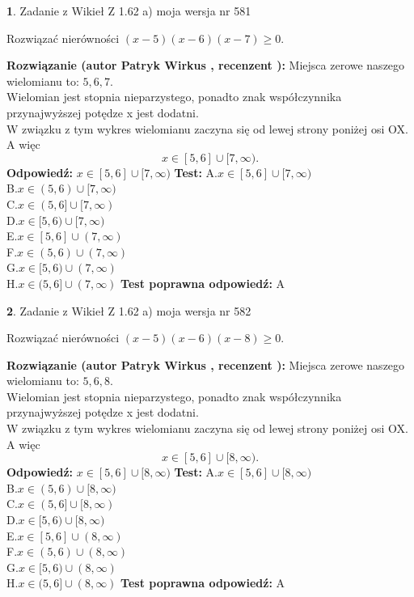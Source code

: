 \documentclass[12pt, a4paper]{article}
\theoremstyle{definition} %
\newtheorem{zad}{}
\newcommand{\zadStart}[1]{\begin{zad}#1\newline}
\newcommand{\zadStop}{\end{zad}}
\newcommand{\rozwStart}[2]{\noindent \textbf{Rozwiązanie (autor #1 , recenzent #2): }\newline}
\newcommand{\rozwStop}{\newline}
\newcommand{\odpStart}{\noindent \textbf{Odpowiedź:}\newline}
\newcommand{\odpStop}{\newline}
\newcommand{\testStart}{\noindent \textbf{Test:}\newline}
\newcommand{\testStop}{\newline}
\newcommand{\kluczStart}{\noindent \textbf{Test poprawna odpowiedź:}\newline}
\newcommand{\kluczStop}{\newline}
\begin{document}
\zadStart{Zadanie z Wikieł Z 1.62 a) moja wersja nr 581}

Rozwiązać nierówności $(x-5)(x-6)(x-7)\ge0$.
\zadStop
\rozwStart{Patryk Wirkus}{}
Miejsca zerowe naszego wielomianu to: $5, 6, 7$.\\
Wielomian jest stopnia nieparzystego, ponadto znak współczynnika przy\linebreak najwyższej potędze x jest dodatni.\\ W związku z tym wykres wielomianu zaczyna się od lewej strony poniżej osi OX. A więc $$x \in [5,6] \cup [7,\infty).$$
\rozwStop
\odpStart
$x \in [5,6] \cup [7,\infty)$
\odpStop
\testStart
A.$x \in [5,6] \cup [7,\infty)$\\
B.$x \in (5,6) \cup [7,\infty)$\\
C.$x \in (5,6] \cup [7,\infty)$\\
D.$x \in [5,6) \cup [7,\infty)$\\
E.$x \in [5,6] \cup (7,\infty)$\\
F.$x \in (5,6) \cup (7,\infty)$\\
G.$x \in [5,6) \cup (7,\infty)$\\
H.$x \in (5,6] \cup (7,\infty)$
\testStop
\kluczStart
A
\kluczStop



\zadStart{Zadanie z Wikieł Z 1.62 a) moja wersja nr 582}

Rozwiązać nierówności $(x-5)(x-6)(x-8)\ge0$.
\zadStop
\rozwStart{Patryk Wirkus}{}
Miejsca zerowe naszego wielomianu to: $5, 6, 8$.\\
Wielomian jest stopnia nieparzystego, ponadto znak współczynnika przy\linebreak najwyższej potędze x jest dodatni.\\ W związku z tym wykres wielomianu zaczyna się od lewej strony poniżej osi OX. A więc $$x \in [5,6] \cup [8,\infty).$$
\rozwStop
\odpStart
$x \in [5,6] \cup [8,\infty)$
\odpStop
\testStart
A.$x \in [5,6] \cup [8,\infty)$\\
B.$x \in (5,6) \cup [8,\infty)$\\
C.$x \in (5,6] \cup [8,\infty)$\\
D.$x \in [5,6) \cup [8,\infty)$\\
E.$x \in [5,6] \cup (8,\infty)$\\
F.$x \in (5,6) \cup (8,\infty)$\\
G.$x \in [5,6) \cup (8,\infty)$\\
H.$x \in (5,6] \cup (8,\infty)$
\testStop
\kluczStart
A
\kluczStop
\end{document}
